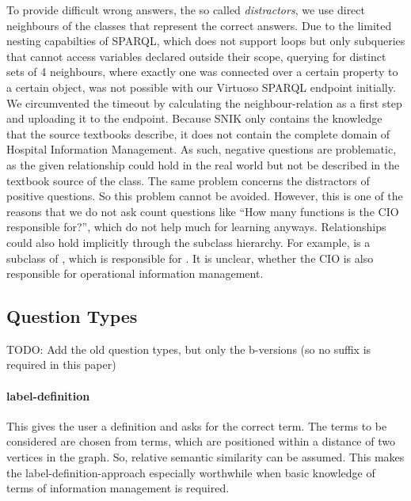 \documentclass{IOS-Book-Article}     %
\begin{document}
To provide difficult wrong answers, the so called \emph{distractors}, we use direct neighbours of the classes that represent the correct answers.
Due to the limited nesting capabilties of SPARQL, which does not support loops but only subqueries that cannot access variables declared outside their scope, querying for distinct sets of 4 neighbours, where exactly one was connected over a certain property to a certain object, was not possible with our Virtuoso SPARQL endpoint initially.
We circumvented the timeout by calculating the neighbour-relation as a first step and uploading it to the endpoint.
%
Because SNIK only contains the knowledge that the source textbooks describe, it does not contain the complete domain of Hospital Information Management.
As such, negative questions are problematic, as the given relationship could hold in the real world but not be described in the textbook source of the class.
The same problem concerns the distractors of positive questions.
So this problem cannot be avoided.
However, this is one of the reasons that we do not ask count questions like \enquote{How many functions is the CIO responsible for?}, which do not help much for learning anyways. %
Relationships could also hold implicitly through the subclass hierarchy.
For example,  is a subclass of , which is responsible for .
It is unclear, whether the CIO is also responsible for operational information management.



\subsection{Question Types}
\iffalse
TODO: Add the old question types, but only the b-versions (so no suffix is required in this paper)

\paragraph{label-definition}
This gives the user a definition and asks for  the correct term. The terms to be considered are chosen from terms, which are positioned within a distance of two vertices in the graph. So, relative semantic similarity can be assumed. This makes the label-definition-approach especially worthwhile when basic knowledge of terms of information management is required.
 
\end{document}

